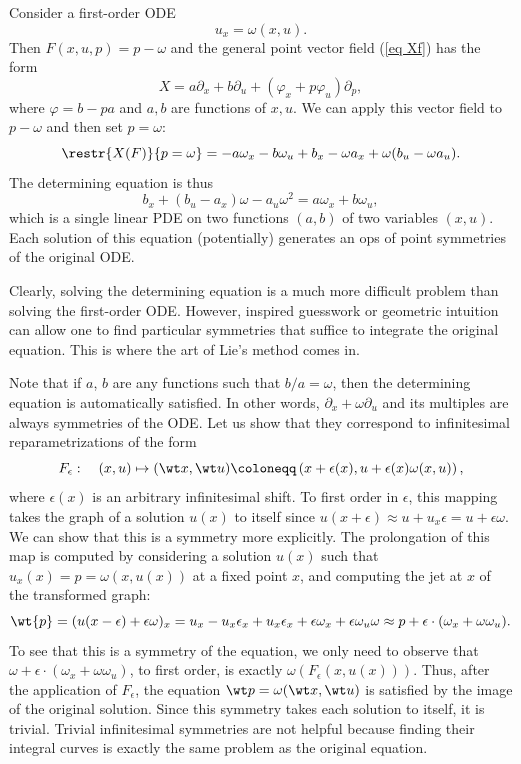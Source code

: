 \begin{example}\label{ex first-order ODE}
    Consider a first-order ODE 
    \[u_x=\omega(x,u).\]
    Then $F(x,u,p)=p-\omega$ and the general point vector field (\ref{eq Xf}) has the form 
    \[X=a\partial_x+b\partial_u+(\varphi_x+p\varphi_u)\partial_p,\]
    where $\varphi=b-pa$ and $a,b$ are functions of $x,u$. We can apply this vector field to $p-\omega$ and then set $p=\omega$:
    \[\restr{X(F)}{p=\omega}=-a\omega_x-b\omega_u+b_x-\omega a_x+\omega(b_u-\omega a_u).\]
    The determining equation is thus
    \[b_x+(b_u-a_x)\omega- a_u\omega^2=a\omega_x+b\omega_u,\]
    which is a single linear PDE on two functions $(a,b)$ of two variables $(x,u)$. Each solution of this equation (potentially) generates an \gls{ops} of point symmetries of the original ODE. 
    
    Clearly, solving the determining equation is a much more difficult problem than solving the first-order ODE. However, inspired guesswork or geometric intuition can allow one to find particular symmetries that suffice to integrate the original equation. This is where the art of Lie's method comes in.

    Note that if $a$, $b$ are any functions such that $b/a=\omega$, then the determining equation is automatically satisfied. In other words, $\partial_x+\omega\partial_u$ and its multiples are always symmetries of the ODE. Let us show that they correspond to infinitesimal reparametrizations of the form
    \[F_\epsilon:\quad (x,u)\mapsto (\wt x,\wt u)\coloneqq \left(x+\epsilon(x),u+\epsilon(x)\omega(x,u)\right),\]
    where $\epsilon(x)$ is an arbitrary infinitesimal shift. To first order in $\epsilon$, this mapping takes the graph of a solution $u(x)$ to itself since $u(x+\epsilon)\approx u+u_x\epsilon=u+\epsilon\omega$. We can show that this is a symmetry more explicitly. The prolongation of this map is computed by considering a solution $u(x)$ such that $u_x(x)=p=\omega(x,u(x))$ at a fixed point $x$, and computing the jet at $x$ of the transformed graph:
    \[\wt{p}=(u(x-\epsilon)+\epsilon\omega)_x=u_x-u_x\epsilon_x+u_x\epsilon_x+\epsilon\omega_x+\epsilon\omega_u\omega\approx p+\epsilon\cdot (\omega_x+\omega\omega_u).\]
    To see that this is a symmetry of the equation, we only need to observe that $\omega+\epsilon\cdot (\omega_x+\omega\omega_u)$, to first order, is exactly $\omega(F_\epsilon(x,u(x)))$. Thus, after the application of $F_\epsilon$, the equation $\wt p=\omega(\wt x,\wt u)$ is satisfied by the image of the original solution. Since this symmetry takes each solution to itself, it is trivial. Trivial infinitesimal symmetries are not helpful because finding their integral curves is exactly the same problem as the original equation.


\end{example}
